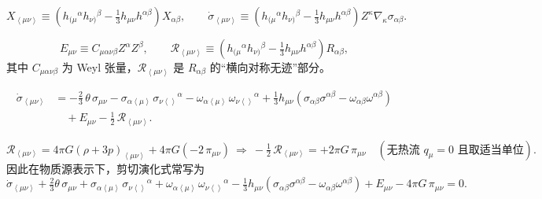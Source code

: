 \newcommand{\ang}[1]{\left\langle #1 \right\rangle} %

\begin{equation}
X_{\ang{\mu\nu}} \equiv
\left(
h_{(\mu}{}^{\alpha} h_{\nu)}{}^{\beta}
-\tfrac{1}{3} h_{\mu\nu} h^{\alpha\beta}
\right) X_{\alpha\beta},
\qquad
\dot{\sigma}_{\ang{\mu\nu}} \equiv
\left(
h_{(\mu}{}^{\alpha} h_{\nu)}{}^{\beta}
-\tfrac{1}{3} h_{\mu\nu} h^{\alpha\beta}
\right) Z^\kappa \nabla_\kappa \sigma_{\alpha\beta}.
\end{equation}

\begin{equation}
E_{\mu\nu} \equiv C_{\mu\alpha\nu\beta} Z^\alpha Z^\beta,
\qquad
\mathcal{R}_{\ang{\mu\nu}} \equiv
\left(
h_{(\mu}{}^{\alpha} h_{\nu)}{}^{\beta}
-\tfrac{1}{3} h_{\mu\nu} h^{\alpha\beta}
\right) R_{\alpha\beta},
\end{equation}
其中 $C_{\mu\alpha\nu\beta}$ 为 Weyl 张量，$\mathcal{R}_{\ang{\mu\nu}}$ 是 ${R}_{\alpha\beta}$ 的“横向对称无迹”部分。

\begin{align}
\dot{\sigma}_{\ang{\mu\nu}}
&= -\tfrac{2}{3}\,\theta\,\sigma_{\mu\nu}
   - \sigma_{\alpha\ang{\mu}\,}\sigma_{\nu\ang{}}{}^{\alpha}
   - \omega_{\alpha\ang{\mu}\,}\omega_{\nu\ang{}}{}^{\alpha}
   + \tfrac{1}{3} h_{\mu\nu}\left(\sigma_{\alpha\beta}\sigma^{\alpha\beta}
   - \omega_{\alpha\beta}\omega^{\alpha\beta}\right)
\nonumber\\
&\quad
+ E_{\mu\nu}
- \tfrac{1}{2}\,\mathcal{R}_{\ang{\mu\nu}} .
\label{eq:shear-evolution-ricci}
\end{align}

\begin{equation}
\mathcal{R}_{\ang{\mu\nu}}
= 4\pi G\left( \rho + 3p \right)_{\ang{\mu\nu}}
+4\pi G\left(-2\,\pi_{\mu\nu}\right)
\ \Longrightarrow\
-\tfrac{1}{2}\,\mathcal{R}_{\ang{\mu\nu}}
= +2\pi G\,\pi_{\mu\nu} \quad (\text{无热流 }q_\mu=0 \text{ 且取适当单位}).
\end{equation}
因此在物质源表示下，剪切演化式常写为
\begin{equation}
\dot{\sigma}_{\ang{\mu\nu}}
+ \tfrac{2}{3}\theta\,\sigma_{\mu\nu}
+ \sigma_{\alpha\ang{\mu}\,}\sigma_{\nu\ang{}}{}^{\alpha}
+ \omega_{\alpha\ang{\mu}\,}\omega_{\nu\ang{}}{}^{\alpha}
- \tfrac{1}{3} h_{\mu\nu}\left(\sigma_{\alpha\beta}\sigma^{\alpha\beta}
- \omega_{\alpha\beta}\omega^{\alpha\beta}\right)
+ E_{\mu\nu}
- 4\pi G\,\pi_{\mu\nu}
=0 .
\label{eq:shear-evolution-matter}
\end{equation}

